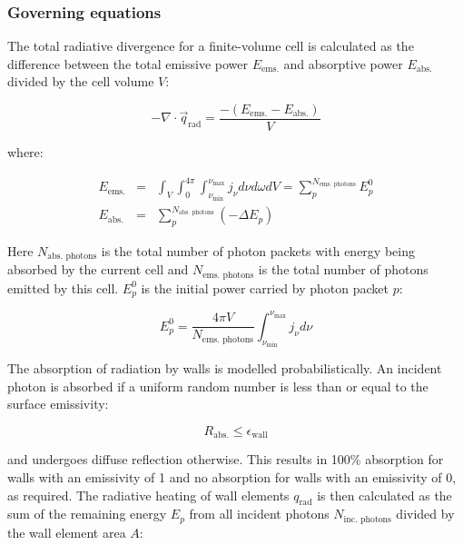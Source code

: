 \subsubsection{Governing equations}

The total radiative divergence for a finite-volume cell is calculated as the difference between the total emissive power $E_{\text{ems.}}$ and absorptive power $E_{\text{abs.}}$ divided by the cell volume $V$:

\begin{equation}
 - \nabla \cdot \vec{q}_\text{rad} = \frac{ - \left ( E_{\text{ems.}} - E_{\text{abs.}} \right ) }{V}
 \label{eq:my_divq_MC}
\end{equation}

\noindent where:

\begin{eqnarray}
 E_{\text{ems.}} &=& \int_{V} \int_{0}^{{4\pi}} \int_{\nu_{\text{min}}}^{\nu_{\text{max}}} j_{\nu} d\nu d\omega dV = \sum_{p}^{N_{\text{ems. photons}}} E_{p}^0 \label{eq:E_emission_MC} \\
 E_{\text{abs.}} &=& \sum_{p}^{N_{\text{abs. photons}}} \left ( - \Delta E_{p} \right ) \label{eq:E_absorption_MC} 
\end{eqnarray}

\noindent Here $N_{\text{abs. photons}}$ is the total number of photon packets with energy being absorbed by the current cell and $N_{\text{ems. photons}}$ is the total number of photons emitted by this cell.
$E_{p}^0$ is the initial power carried by photon packet $p$:

\begin{equation}
 E_{p}^0 = \frac{ 4 \pi V  }{ N_{\text{ems. photons} } } \int_{\nu_{\text{min}}}^{\nu_{\text{max}}} j_{\nu} d \nu
\end{equation}

The absorption of radiation by walls is modelled probabilistically.  An incident photon is absorbed if a uniform random number is less than or equal to the surface emissivity:

\begin{equation}
R_\text{abs.} \leq \epsilon_\text{wall}
\end{equation}

\noindent and undergoes diffuse reflection otherwise.
This results in 100\% absorption for walls with an emissivity of 1 and no absorption for walls with an emissivity of 0, as required.
The radiative heating of wall elements $q_\text{rad}$ is then calculated as the sum of the remaining energy $E_{p}$ from all incident photons $N_\text{inc. photons}$ divided by the wall element area $A$:


